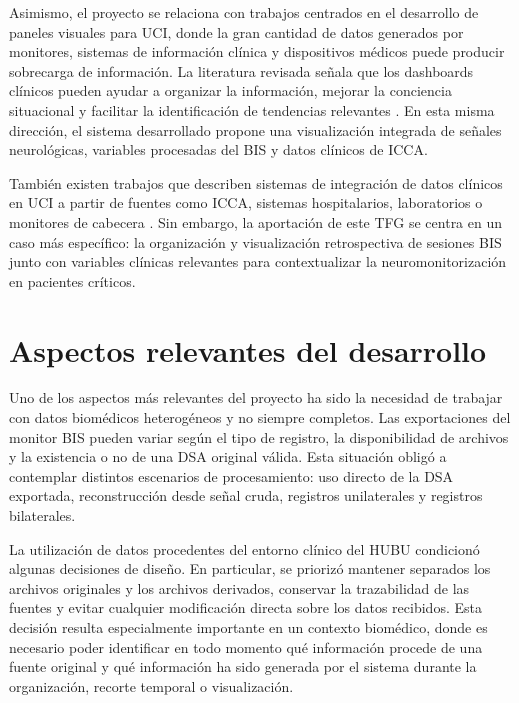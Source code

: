 \documentclass[
  spanish,
  a4paper,
  12pt,
  twoside]{memoir}
\begin{document}
Asimismo, el proyecto se relaciona con trabajos centrados en el
desarrollo de paneles visuales para UCI, donde la gran cantidad de datos
generados por monitores, sistemas de información clínica y dispositivos
médicos puede producir sobrecarga de información. La literatura revisada
señala que los dashboards clínicos pueden ayudar a organizar la
información, mejorar la conciencia situacional y facilitar la
identificación de tendencias relevantes \citep{Khairat2018, Wright2019}.
En esta misma dirección, el sistema desarrollado propone una
visualización integrada de señales neurológicas, variables procesadas
del BIS y datos clínicos de ICCA.

También existen trabajos que describen sistemas de integración de datos
clínicos en UCI a partir de fuentes como ICCA, sistemas hospitalarios,
laboratorios o monitores de cabecera \citep{Lai2022, Sun2020}. Sin
embargo, la aportación de este TFG se centra en un caso más específico:
la organización y visualización retrospectiva de sesiones BIS junto con
variables clínicas relevantes para contextualizar la neuromonitorización
en pacientes críticos.

\section{Aspectos relevantes del
desarrollo}\label{aspectos-relevantes-del-desarrollo}

Uno de los aspectos más relevantes del proyecto ha sido la necesidad de
trabajar con datos biomédicos heterogéneos y no siempre completos. Las
exportaciones del monitor BIS pueden variar según el tipo de registro,
la disponibilidad de archivos y la existencia o no de una DSA original
válida. Esta situación obligó a contemplar distintos escenarios de
procesamiento: uso directo de la DSA exportada, reconstrucción desde
señal cruda, registros unilaterales y registros bilaterales.

La utilización de datos procedentes del entorno clínico del HUBU
condicionó algunas decisiones de diseño. En particular, se priorizó
mantener separados los archivos originales y los archivos derivados,
conservar la trazabilidad de las fuentes y evitar cualquier modificación
directa sobre los datos recibidos. Esta decisión resulta especialmente
importante en un contexto biomédico, donde es necesario poder
identificar en todo momento qué información procede de una fuente
original y qué información ha sido generada por el sistema durante la
organización, recorte temporal o visualización.
\end{document}
